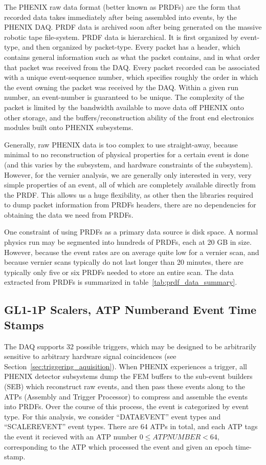The PHENIX raw data format (better known as PRDFs) are the form that recorded
data takes immediately after being assembled into events, by the PHENIX DAQ.
PRDF data is archived soon after being generated on the massive robotic tape
file-system. PRDF data is hierarchical. It is first organized by event-type,
and then organized by packet-type.  Every packet has a header, which contains
general information such as what the packet contains, and in what order that
packet was received from the DAQ. Every packet recorded can be associated with
a unique event-sequence number, which specifies roughly the order in which the
event owning the packet was received by the DAQ. Within a given run number, an
event-number is guaranteed to be unique. The complexity of the packet is
limited by the bandwidth available to move data off PHENIX onto other storage,
and the buffers/reconstruction ability of the front end electronics modules
built onto PHENIX subsystems.

Generally, raw PHENIX data is too complex to use straight-away, because minimal
to no reconstruction of physical properties for a certain event is done (and
this varies by the subsystem, and hardware constraints of the subsystem).
However, for the vernier analysis, we are generally only interested in very,
very simple properties of an event, all of which are completely available
directly from the PRDF. This allows us a huge flexibility, as other then the
libraries required to dump packet information from PRDFs headers, there are no
dependencies for obtaining the data we need from PRDFs.

One constraint of using PRDFs as a primary data source is disk space. A normal
physics run may be segmented into hundreds of PRDFs, each at 20 GB in size.
However, because the event rates are on average quite low for a vernier scan,
and because vernier scans typically do not last longer than 20 minutes, there
are typically only five or six PRDFs needed to store an entire scan. The data extracted from PRDFs is summarized in table~\ref{tab:prdf_data_summary}.

\subsection{GL1-1P Scalers, ATP Numberand Event Time Stamps}

The DAQ supports 32 possible triggers, which may be designed to be arbitrarily
sensitive to arbitrary hardware signal coincidences (see
Section~\ref{sec:triggering_aquisition}). When PHENIX experiences a trigger,
all PHENIX detector subsystems dump the FEM buffers to the sub-event builders
(SEB) which reconstruct raw events, and then pass these events along to the
ATPs (Assembly and Trigger Processor) to compress and assemble the events into
PRDFs. Over the course of this process, the event is categorized by event type.
For this analysis, we consider ``DATAEVENT'' event types and ``SCALEREVENT''
event types. There are 64 ATPs in total, and each ATP tags the event it
recieved with an ATP number $0 \leq ATPNUMBER < 64$, corresponding to the ATP
which processed the event and given an epoch time-stamp. 

